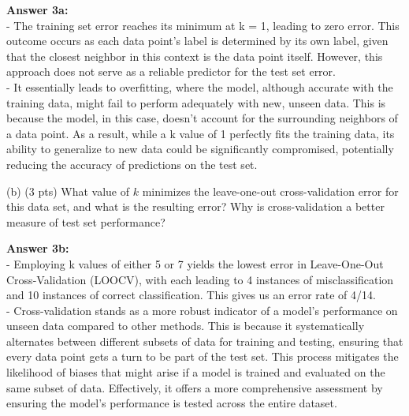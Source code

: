 \documentclass[10pt]{article}
\begin{document}
\begin{flushleft}

\textbf{Answer 3a:} \\

- The training set error reaches its minimum at k = 1, leading to zero error. This outcome occurs as each data point's label is determined by its own label, given that the closest neighbor in this context is the data point itself. However, this approach does not serve as a reliable predictor for the test set error. \\
- It essentially leads to overfitting, where the model, although accurate with the training data, might fail to perform adequately with new, unseen data. This is because the model, in this case, doesn't account for the surrounding neighbors of a data point. As a result, while a k value of 1 perfectly fits the training data, its ability to generalize to new data could be significantly compromised, potentially reducing the accuracy of predictions on the test set. \\

    
\end{flushleft}

(b) (3 pts) What value of $k$ minimizes the leave-one-out cross-validation error for this data set, and what is the resulting error? Why is cross-validation a better measure of test set performance?

\begin{flushleft}

\textbf{Answer 3b:} \\
- Employing k values of either 5 or 7 yields the lowest error in Leave-One-Out Cross-Validation (LOOCV), with each leading to 4 instances of misclassification and 10 instances of correct classification. This gives us an error rate of 4/14. \\

- Cross-validation stands as a more robust indicator of a model's performance on unseen data compared to other methods. This is because it systematically alternates between different subsets of data for training and testing, ensuring that every data point gets a turn to be part of the test set. This process mitigates the likelihood of biases that might arise if a model is trained and evaluated on the same subset of data. Effectively, it offers a more comprehensive assessment by ensuring the model's performance is tested across the entire dataset. \\
    
\end{flushleft}
\end{document}
